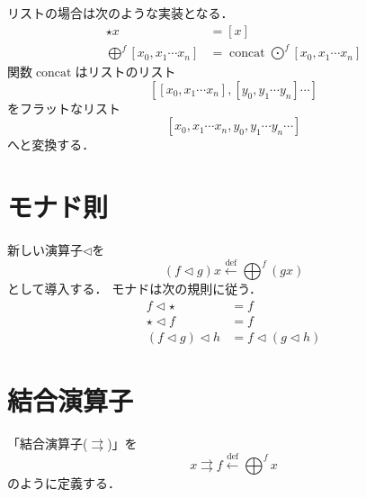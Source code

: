 \documentclass[twocolumn]{jsbook}
\newcommand{\bind}{\rightrightarrows} %
\newcommand{\defeq}{\xleftarrow{\text{def}}}
\newcommand{\haskelllambda}{\backslash}
\newcommand{\mapfunc}{\bigodot} %
\newcommand{\monadfunc}{\bigoplus}
\newcommand{\unit}{\star} %
\newcommand{\concat}{\mathop{\text{concat}}}
\newcommand{\typename}[1]{\bm{#1}}
\newcommand{\listtype}[1]{\left[#1\right]}
\newcommand{\maybe}[1]{\left\{#1\right\}}
\newcommand{\monad}[1]{\left[\!\left[#1\right]\!\right]}
\newcommand{\specialkeyword}[1]{\textsf{#1}}
\newcommand{\nothing}{\specialkeyword{Nothing}}
\begin{document}
% 
% 
% 

リストの場合は次のような実装となる．
\begin{align*}
\unit x&=\listtype{x}\\
\monadfunc^f\listtype{x_0,x_1\dotsb x_n}&=\concat\mapfunc^f\listtype{x_0,x_1\dotsb x_n}
\end{align*}
関数$\concat$はリストのリスト$$\listtype{\listtype{x_0,x_1\dotsb x_n},\listtype{y_0,y_1\dotsb y_n}\dotsb}$$をフラットなリスト$$\listtype{x_0,x_1\dotsb x_n,y_0,y_1\dotsb y_n\dotsb}$$へと変換する．




\section{モナド則}

新しい演算子$\triangleleft$を$$(f\triangleleft g)x\defeq\monadfunc^f(gx)$$として導入する．
モナドは次の規則に従う．
\begin{align}
f\triangleleft\unit&=f\\
\unit\triangleleft f&=f\\
(f\triangleleft g)\triangleleft h&=f\triangleleft(g\triangleleft h)
\end{align}

\section{結合演算子}

「結合演算子($\bind$)」を$$x\bind f\defeq \monadfunc^fx$$のように定義する．
\end{document}
